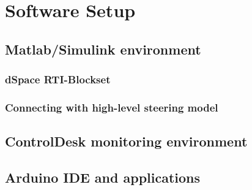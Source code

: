 \documentclass[ExampleMasters.tex]{subfiles}
\begin{document}
\clearpage


\chapter{Software Setup}
\label{chap:software_setup}
\section{Matlab/Simulink environment}
\label{sec:matlab}
\subsection{dSpace RTI-Blockset}
\subsection{Connecting with high-level steering model}
\section{ControlDesk monitoring environment}
\label{sec:control_desk}
\section{Arduino IDE and applications}
\label{sec:arduino_applications}
\end{document}
